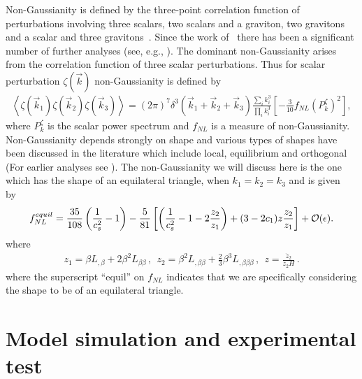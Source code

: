 \documentclass[a4paper,11pt]{article}
\begin{document}

  Non-Gaussianity is defined by the three-point correlation function of perturbations involving
  three scalars, two scalars and a graviton, two gravitons and a scalar and three gravitons~\cite{Maldacena:2002vr}.
  Since the work of~\cite{Maldacena:2002vr}  there has been
  a significant number of further analyses (see, e.g., \cite{Acquaviva:2002ud,Creminelli:2003iq,
  Silverstein:2003hf,Gruzinov:2004jx,Alishahiha:2004eh,Chen:2005fe,Creminelli:2005hu,
  Seery:2005wm,Babich:2004gb,Lyth:2005fi,Chen:2006nt, Huang:2007hh,Langlois:2008wt}).
  The dominant non-Gaussianity
  arises from the correlation function of three scalar perturbations. Thus for scalar perturbation $\zeta(\vec k)$ non-Gaussianity
  is defined by
  \begin{align}
    \left< \zeta(\vec k_1) \zeta(\vec k_2) \zeta(\vec k_3) \right> = (2\pi)^7 \delta^3(\vec k_1+ \vec k_2+ \vec k_3) \frac{\sum_i k_i^3}{\prod_i k_i^3}
    \left[ -\frac{3}{10} f_{NL} (P_k^{\zeta})^2 \right],
  \end{align}
  where $P_k^{\zeta}$ is the scalar power spectrum and $f_{NL}$ is a measure of non-Gaussianity.
  Non-Gaussianity depends strongly on  shape and various types of shapes have been discussed in the
literature which include local, equilibrium and orthogonal ~\cite{Ade:2015ava} (For earlier analyses see 
\cite{Komatsu:2001rj,Komatsu:2003fd,Verde:1999ij}).
 The non-Gaussianity  we will discuss here is the one which has the shape of an equilateral triangle, 
  when $k_1=k_2=k_3$ and  is given by~\cite{Chen:2006nt}
  \begin{align}
   f^{equil}_{NL}= \frac{35}{108}\left(\frac{1}{c_s^2}-1\right) - \frac{5}{81} \left[ \left(\frac{1}{c_s^2} -1- 2\frac{z_2}{z_1}\right) + (3-2 {c}_1)z \frac{z_2}{z_1}\right] + {\cal O}(\epsilon).
    \label{equil}
  \end{align}
  where
  \begin{align}
    z_1= \beta L_{,\beta} + 2 \beta^2 L_{\beta\beta}\,,~~
    z_2= \beta^2 L_{,\beta \beta} + \frac{2}{3} \beta^3 L_{,\beta\beta\beta}\,,~~
    z= \frac{\dot z_2}{z_2 H}\,.
  \end{align}
 where the superscript ``equil''  on $f_{NL}$ indicates that we are specifically considering the shape to be of an equilateral
 triangle.
  
\section{Model simulation and experimental test \label{sec6}}
\end{document}
